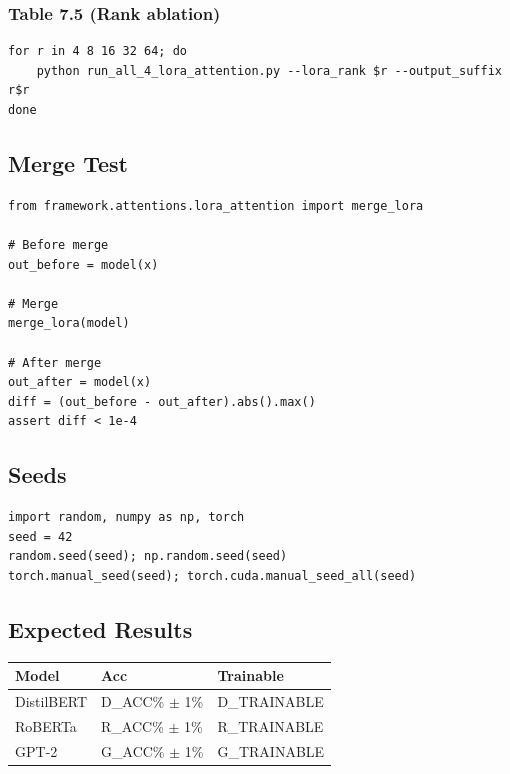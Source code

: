\subsubsection{Table 7.5 (Rank ablation)}
\begin{lstlisting}
for r in 4 8 16 32 64; do
    python run_all_4_lora_attention.py --lora_rank $r --output_suffix r$r
done
\end{lstlisting}

\subsection{Merge Test}

\begin{lstlisting}
from framework.attentions.lora_attention import merge_lora

# Before merge
out_before = model(x)

# Merge
merge_lora(model)

# After merge
out_after = model(x)
diff = (out_before - out_after).abs().max()
assert diff < 1e-4
\end{lstlisting}

\subsection{Seeds}

\begin{lstlisting}
import random, numpy as np, torch
seed = 42
random.seed(seed); np.random.seed(seed)
torch.manual_seed(seed); torch.cuda.manual_seed_all(seed)
\end{lstlisting}

\subsection{Expected Results}

\begin{table}[H]
\centering
\small
\begin{tabular}{lll}
\toprule
\textbf{Model} & \textbf{Acc} & \textbf{Trainable} \\
\midrule
DistilBERT & {{D\_ACC}}\% $\pm$ 1\% & {{D\_TRAINABLE}} \\
RoBERTa & {{R\_ACC}}\% $\pm$ 1\% & {{R\_TRAINABLE}} \\
GPT-2 & {{G\_ACC}}\% $\pm$ 1\% & {{G\_TRAINABLE}} \\
\bottomrule
\end{tabular}
\end{table}

